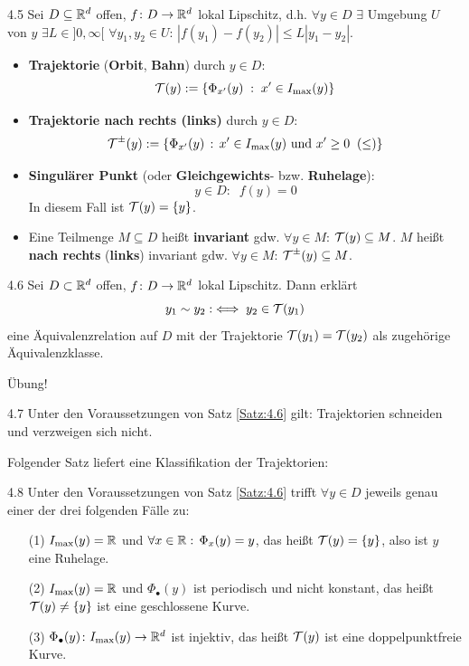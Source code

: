 \documentclass[a4paper]{article}
\begin{document}
\begin{Def}{}{4.5}
Sei $D\subseteq\mathbb R^d$ offen, $f\colon D\to\mathbb R^d$ lokal Lipschitz, d.h. $\forall y\in D$ $\exists$ Umgebung $U$ von $y$ $\exists L\in ]0,\infty[$ $\forall y_1,y_2\in U:\,|f(y_1)-f(y_2)|\le L|y_1-y_2|$.
\begin{itemize}
\item \textbf{Trajektorie} (\textbf{Orbit}, \textbf{Bahn}) durch $y\in D$:
\[\operatorname{\mathcal{T}}(y):=\{\Phi_{x'}(y)\;:\;x'\in I_{\max}(y)\}\]
\item \textbf{Trajektorie nach rechts (links)} durch $y\in D$:
\[\operatorname{\mathcal{T}}^{\pm}(y):=\{\Phi_{x'}(y)\,:\,x'\in I_{\max}(y)\text{ und } x'\ge 0\;\;(\le)\}\]

\item \textbf{Singulärer Punkt} (oder \textbf{Gleichgewichts}- bzw. \textbf{Ruhelage}):
\[y\in D:\;\;f(y)=0\]
In diesem Fall ist $\operatorname{\mathcal{T}}(y)=\{y\}$.
\item Eine Teilmenge $M\subseteq D$ heißt \textbf{invariant} gdw. $\forall y\in M$: $\operatorname{\mathcal{T}}(y)\subseteq M$. $M$ heißt \textbf{nach rechts} (\textbf{links}) invariant gdw. $\forall y\in M$: $\operatorname{\mathcal{T}}^{\pm}(y)\subseteq M$.
\end{itemize}
\end{Def}
\begin{Satz}{}{4.6}
Sei $D\subset \mathbb R^d$ offen, $f\colon D\to\mathbb R^d$ lokal Lipschitz. Dann erklärt
\[y_1\sim y_2:\iff y_2\in \operatorname{\mathcal{T}}(y_1)\]
eine Äquivalenzrelation auf $D$ mit der Trajektorie $\operatorname{\mathcal{T}}(y_1)=\operatorname{\mathcal{T}}(y_2)$ als zugehörige Äquivalenzklasse.
\end{Satz}
\begin{Beweis}
Übung!
\end{Beweis}
\begin{Kor}{}{4.7}
Unter den Voraussetzungen von Satz \ref{Satz:4.6} gilt: Trajektorien schneiden und verzweigen sich nicht.
\end{Kor}

Folgender Satz liefert eine Klassifikation der Trajektorien:
\begin{Satz}{}{4.8}
Unter den Voraussetzungen von Satz \ref{Satz:4.6} trifft $\forall y\in D$ jeweils genau einer der drei folgenden Fälle zu:
\begin{itemize}
\item[(1)]$I_{\max}(y)=\mathbb R$ und $\forall x\in\mathbb R:\,\Phi_x(y)=y$, das heißt $\operatorname{\mathcal{T}}(y)=\{y\}$, also ist $y$ eine Ruhelage.
\item[(2)] $I_{\max}(y)=\mathbb R$ und $\Phi_{\bullet}(y)$ ist periodisch und nicht konstant, das heißt $\operatorname{\mathcal{T}}(y)\ne\{y\}$ ist eine geschlossene Kurve.
\item[(3)] $\Phi_{\bullet}(y)\colon I_{\max}(y)\to\mathbb R^d$ ist injektiv, das heißt $\operatorname{\mathcal{T}}(y)$ ist eine doppelpunktfreie Kurve.
\end{itemize}
\end{Satz}
\end{document}
